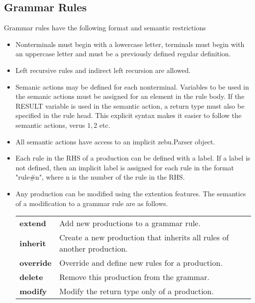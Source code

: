 \documentclass[12pt]{article}
\begin{document}
\subsection{Grammar Rules}

Grammar rules have the following format and semantic restrictions

\begin{itemize}

\item Nonterminals must begin with a lowercase letter, terminals must begin with an uppercase letter and must be a previously defined regular definition.

\item Left recursive rules and indirect left recursion are allowed.

\item Semanic actions may be defined for each nonterminal. Variables to be used in the semanic actions must be assigned for an element in the rule body. If the RESULT variable is used in the semantic action, a return type must also be specified in the rule head. This explicit syntax makes it easier to follow the semantic actions, verus $1, $2 etc.

\item All semantic actions have access to an implicit zebu.Parser object.

\item Each rule in the RHS of a production can be defined with a label. If a label is not defined, then an implicit label is assigned for each rule in the format "rule\#{n}", where n is the number of the rule in the RHS.

\item Any production can be modified using the extention features. The semantics of a modification to a grammar rule are as follows.

\begin{tabular}{l l}
\textbf{extend}   & Add new productions to a grammar rule.            \\
\textbf{inherit}  & Create a new production that inherits all rules of another production. \\
\textbf{override} & Override and define new rules for a production.   \\
\textbf{delete}   & Remove this production from the grammar.          \\
\textbf{modify}   & Modify the return type only of a production.      \\
\end{tabular}



\end{itemize}
\end{document}
